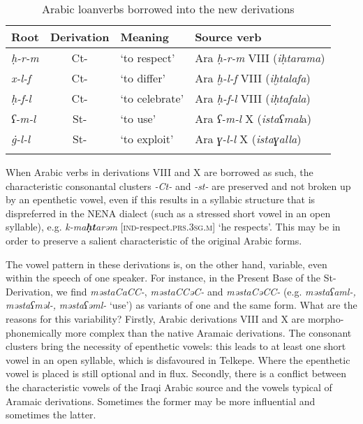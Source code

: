 \documentclass[output=paper]{langsci/langscibook}
\begin{document}
\begin{table}
\caption{Arabic loanverbs borrowed into the new derivations\label{tab:coghill:1}}
\begin{tabular}{lcll}
\lsptoprule
{Root} & {Derivation} & {Meaning} & {Source verb}\\\midrule
{\textit{ḥ-r-m}} & {Ct-} & {‘to respect’} & {Ara \textit{ḥ-r-m} VIII (\textit{iḥtarama})}\\
\textit{x-l-f} & Ct- & ‘to differ’ & {Ara \textit{ḫ-l-f} VIII (\textit{iḫtalafa})}\\
{\textit{ḥ-f-l}} & {Ct-} & {‘to celebrate’} & {Ara \textit{ḥ-f-l} VIII (\textit{iḥtafala})}\\
{\textit{ʕ-m-l}} & {St-} & {‘to use’} & {Ara \textit{ʕ-m-l} X (\textit{istaʕmal}a)}\\
\textit{\.g-l-l} & {St-} & {‘to exploit’} & {Ara \textit{ɣ-l-l} X (\textit{istaɣalla})}\\
\lspbottomrule
\end{tabular}
\end{table}

When Arabic verbs in derivations VIII and X are borrowed as such, the characteristic consonantal clusters \textit{{}-Ct-} and \textit{{}-st-} are preserved and not broken up by an epenthetic vowel, even if this results in a syllabic structure that is dispreferred in the NENA dialect (such as a stressed short vowel in an open syllable), e.g. \textit{k-ma}\textbf{\textit{ḥt}}\textit{arəm} [\textsc{ind}\nobreakdash-respect.\textsc{prs.}3\textsc{sg.m}] ‘he respects’. This may be in order to preserve a salient characteristic of the original Arabic forms.

The vowel pattern in these derivations is, on the other hand, variable, even within the speech of one speaker. For instance, in the Present Base of the St-Derivation, we find \textit{məstaCaCC-}, \textit{məstaCCəC-} and \textit{məstaCəCC-} (e.g. \textit{məstaʕaml-,} \textit{məstaʕməl-,} \textit{məstaʕəml-} ‘use’) as variants of one and the same form. What are the reasons for this variability? Firstly, Arabic derivations VIII and X are morpho-phonemically more complex than the native Aramaic derivations. The consonant clusters bring the necessity of epenthetic vowels: this leads to at least one short vowel in an open syllable, which is disfavoured in Telkepe. Where the epenthetic vowel is placed is still optional and in flux. Secondly, there is a conflict between the characteristic vowels of the Iraqi Arabic source and the vowels typical of Aramaic derivations. Sometimes the former may be more influential and sometimes the latter.
\end{document}
